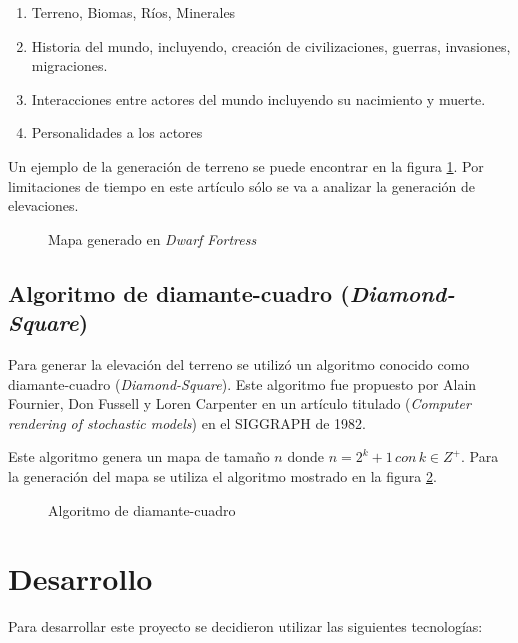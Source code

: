 \documentclass[10pt,letterpaper,oneside]{article}
\begin{document}
\begin{enumerate}
	\item Terreno, Biomas, Ríos, Minerales
	\item Historia del mundo, incluyendo, creación de civilizaciones, guerras, invasiones, migraciones.
	\item Interacciones entre actores del mundo incluyendo su nacimiento y muerte.
	\item Personalidades a los actores
\end{enumerate}

Un ejemplo de la generación de terreno se puede encontrar en la figura \ref{fig:df}. Por limitaciones de tiempo en este artículo sólo se va a analizar la generación de elevaciones.

\begin{figure}[H]
	\centering
	\caption{Mapa generado en \textit{Dwarf Fortress}}
	\label{fig:df}	
\end{figure}

\subsection{Algoritmo de diamante-cuadro (\textit{Diamond-Square})}

Para generar la elevación del terreno se utilizó un algoritmo conocido como diamante-cuadro (\textit{Diamond-Square}). Este algoritmo fue propuesto por Alain Fournier, Don Fussell y Loren Carpenter en un artículo titulado  (\textit{Computer rendering of stochastic models}) en el SIGGRAPH de 1982. 

Este algoritmo genera un mapa de tamaño $n$ donde $n=2^k+1 \, con \, k \in Z^+$. Para la generación del mapa se utiliza el algoritmo mostrado en la figura \ref{fig:diamond_square}.

\begin{figure}[H]
	\centering
	\caption{Algoritmo de diamante-cuadro}
	\label{fig:diamond_square}
\end{figure}

\pagebreak

\section{Desarrollo}

Para desarrollar este proyecto se decidieron utilizar las siguientes tecnologías:
\end{document}
